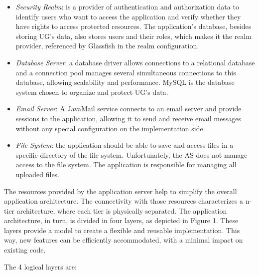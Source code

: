 \documentclass[envcountsame,envcountchap]{svmono}
\begin{document}
\begin{itemize}
\item \textit{Security Realm}: is a provider of authentication and authorization data to identify users who want to access the application and verify whether they have rights to access protected resources.  The application's database, besides storing UG's data, also stores users and their roles, which makes it the realm provider, referenced by Glassfish in the realm configuration.

\item \textit{Database Server}: a database driver allows connections to a relational database and a connection pool manages several simultaneous connections to this database, allowing scalability and performance. MySQL is the database system chosen to organize and protect UG's data.

\item \textit{Email Server}: A JavaMail service connects to an email server and provide sessions to the application, allowing it to send and receive email messages without any special configuration on the implementation side.

\item \textit{File System}: the application should be able to save and access files in a specific directory of the file system. Unfortunately, the AS does not manage access to the file system. The application is responsible for managing all uploaded files.
\end{itemize}

The resources provided by the application server help to simplify the overall application architecture. The connectivity with those resources characterizes a n-tier architecture, where each tier is physically separated. The application architecture, in turn, is divided in four layers, as depicted in Figure 1. These layers provide a model to create a flexible and reusable implementation. This way, new features can be efficiently accommodated, with a minimal impact on existing code.

The 4 logical layers are:
\end{document}

